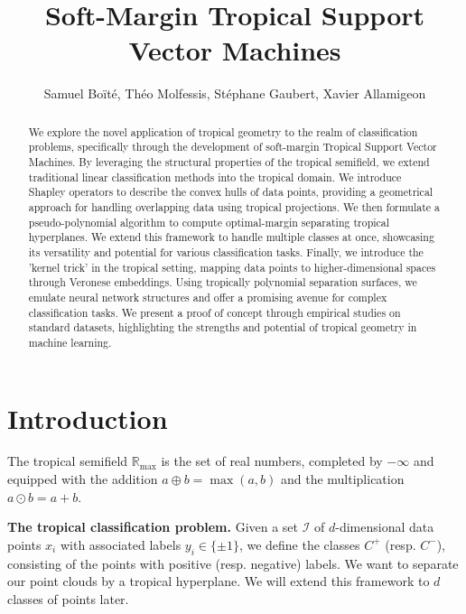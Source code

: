 \documentclass[oneside,english]{amsart}
\numberwithin{equation}{section}
\numberwithin{figure}{section}
\theoremstyle{plain}
\theoremstyle{definition}
\theoremstyle{plain}
\theoremstyle{remark}
\theoremstyle{plain}
\theoremstyle{definition}
\theoremstyle{definition}
\begin{document}
\title{Soft-Margin Tropical Support Vector Machines}
\author{Samuel Boïté, Théo Molfessis, Stéphane Gaubert, Xavier Allamigeon}
\begin{abstract}
We explore the novel application of tropical geometry to the realm of classification problems, specifically through the development of soft-margin Tropical Support Vector Machines. By leveraging the structural properties of the tropical semifield, we extend traditional linear classification methods into the tropical domain. We introduce Shapley operators to describe the convex hulls of data points, providing a geometrical approach for handling overlapping data using tropical projections. We then formulate a pseudo-polynomial algorithm to compute optimal-margin separating tropical hyperplanes. We extend this framework to handle multiple classes at once, showcasing its versatility and potential for various classification tasks. Finally, we introduce the 'kernel trick' in the tropical setting, mapping data points to higher-dimensional spaces through Veronese embeddings. Using tropically polynomial separation surfaces, we emulate neural network structures and offer a promising avenue for complex classification tasks. We present a proof of concept through empirical studies on standard datasets, highlighting the strengths and potential of tropical geometry in machine learning.
\end{abstract}

\maketitle


\section{Introduction}

The tropical semifield $\mathbb{R}_{\max}$ is the set of real numbers,
completed by $-\infty$ and equipped with the addition $a\oplus b=\max(a,b)$
and the multiplication $a\odot b=a+b$. 

\textbf{The tropical classification problem. }Given a set $\mathcal{I}$
of $d$-dimensional data points $x_{i}$ with associated labels $y_{i}\in\{\pm1\}$,
we define the classes $C^{+}$ (resp. $C^{-}$), consisting of the
points with positive (resp. negative) labels. We want to separate
our point clouds by a tropical hyperplane. We will extend this framework to $d$ classes of points later.
\end{document}
